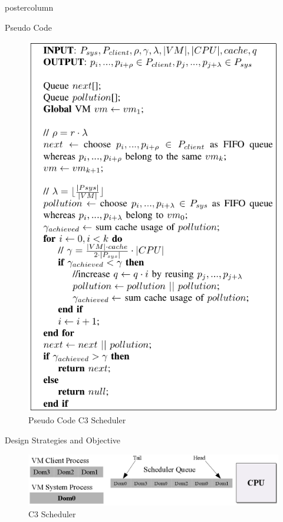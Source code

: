 \documentclass[final,hyperref={pdfpagelabels=false}]{beamer}
\newlength{\columnheight}
\begin{document}
\begin{frame}
\begin{columns}
\begin{column}{.49\textwidth}
\begin{beamercolorbox}[center,wd=\textwidth]{postercolumn}
\begin{minipage}[T]{.95\textwidth} %
\parbox[t][\columnheight]{\textwidth}{ 
         
           

\begin{block}{\Large \color{ta2skyblue} Pseudo Code}

\begin{figure}
\includegraphics[width=0.55\linewidth]{pseudo_code.png}
\caption{\large Pseudo Code C3 Scheduler\cite{c1}}
\end{figure}
\end{block}

\begin{block}{\Large \color{ta2skyblue} Design Strategies and Objective}

\begin{figure}\vspace{1cm}
\includegraphics[width=0.9\linewidth]{c3_scheduler.png}
\caption{\color{black}\large C3 Scheduler}
\end{figure}


\end{block}}
\end{minipage}
\end{beamercolorbox}
\end{column}
\end{columns}
\end{frame}
\end{document}
